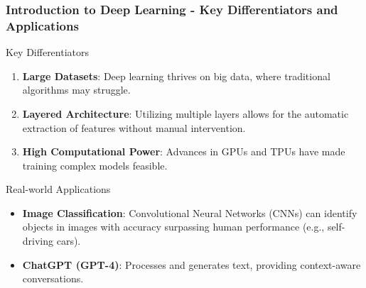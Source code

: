 \documentclass[aspectratio=169]{beamer}
\begin{document}
\begin{frame}[fragile]
    \frametitle{Introduction to Deep Learning - Key Differentiators and Applications}
    \begin{block}{Key Differentiators}
        \begin{enumerate}
            \item \textbf{Large Datasets}: Deep learning thrives on big data, where traditional algorithms may struggle.
            \item \textbf{Layered Architecture}: Utilizing multiple layers allows for the automatic extraction of features without manual intervention.
            \item \textbf{High Computational Power}: Advances in GPUs and TPUs have made training complex models feasible.
        \end{enumerate}
    \end{block}
    
    \begin{block}{Real-world Applications}
        \begin{itemize}
            \item \textbf{Image Classification}: Convolutional Neural Networks (CNNs) can identify objects in images with accuracy surpassing human performance (e.g., self-driving cars).
            \item \textbf{ChatGPT (GPT-4)}: Processes and generates text, providing context-aware conversations.
        \end{itemize}
    \end{block}
\end{frame}
\end{document}
